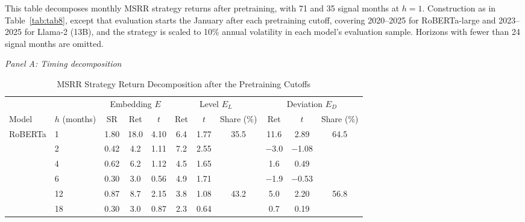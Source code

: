 \begin{table}[htbp]
\centering
\caption{MSRR Strategy Return Decomposition after the Pretraining Cutoffs}
\label{tab:tabC_post_attribution}
\begin{minipage}{\linewidth}\footnotesize
This table decomposes monthly MSRR strategy returns after pretraining, with 71 and 35 signal months at $h=1$. Construction as in Table~\ref{tab:tab8}, except that evaluation starts the January after each pretraining cutoff, covering 2020--2025 for RoBERTa-large and 2023--2025 for Llama-2 (13B), and the strategy is scaled to 10\% annual volatility in each model's evaluation sample. Horizons with fewer than 24 signal months are omitted.
\end{minipage}
\medskip

{\footnotesize
\textit{Panel A: Timing decomposition}\\[2pt]
\begin{adjustbox}{max width=\linewidth, max totalheight=0.28\textheight}
\begin{tabular}{llccccccccc}
\toprule
\multicolumn{2}{c}{} & \multicolumn{3}{c}{Embedding $E$} & \multicolumn{3}{c}{Level $E_L$} & \multicolumn{3}{c}{Deviation $E_D$} \\
\cmidrule(lr){3-5} \cmidrule(lr){6-8} \cmidrule(lr){9-11}
Model & $h$ (months) & SR & Ret & $t$ & Ret & $t$ & Share (\%) & Ret & $t$ & Share (\%) \\
\midrule
RoBERTa & 1 & \phantom{$-$}1.80 & \phantom{$-$}18.0 & \phantom{$-$}4.10 & \phantom{$-$}6.4 & \phantom{$-$}1.77 & \phantom{$-$}35.5 & \phantom{$-$}11.6 & \phantom{$-$}2.89 & \phantom{0}64.5 \\
 & 2 & \phantom{$-$}0.42 & \phantom{$-$0}4.2 & \phantom{$-$}1.11 & \phantom{$-$}7.2 & \phantom{$-$}2.55 &  & \phantom{0}$-$3.0 & $-$1.08 &  \\
 & 4 & \phantom{$-$}0.62 & \phantom{$-$0}6.2 & \phantom{$-$}1.12 & \phantom{$-$}4.5 & \phantom{$-$}1.65 &  & \phantom{$-$0}1.6 & \phantom{$-$}0.49 &  \\
 & 6 & \phantom{$-$}0.30 & \phantom{$-$0}3.0 & \phantom{$-$}0.56 & \phantom{$-$}4.9 & \phantom{$-$}1.71 &  & \phantom{0}$-$1.9 & $-$0.53 &  \\
 & 12 & \phantom{$-$}0.87 & \phantom{$-$0}8.7 & \phantom{$-$}2.15 & \phantom{$-$}3.8 & \phantom{$-$}1.08 & \phantom{$-$}43.2 & \phantom{$-$0}5.0 & \phantom{$-$}2.20 & \phantom{0}56.8 \\
 & 18 & \phantom{$-$}0.30 & \phantom{$-$0}3.0 & \phantom{$-$}0.87 & \phantom{$-$}2.3 & \phantom{$-$}0.64 &  & \phantom{$-$0}0.7 & \phantom{$-$}0.19 &  \\

\end{tabular}
\end{adjustbox}}
\end{table}
